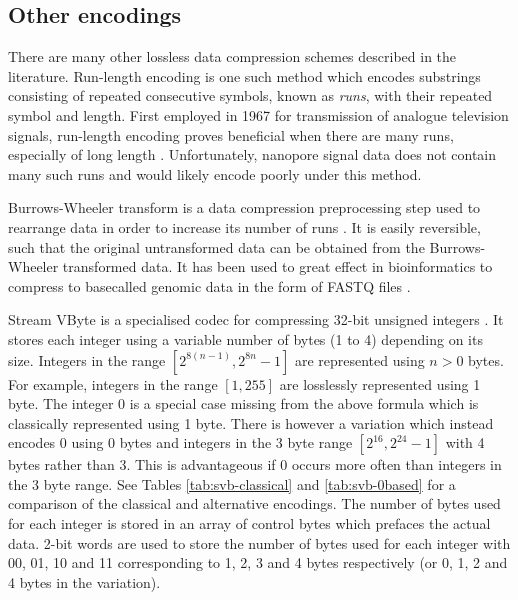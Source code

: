 \subsection{Other encodings}
\label{sec:data-other}

There are many other lossless data compression schemes described in the literature. Run-length encoding is one such method which encodes substrings consisting of repeated consecutive symbols, known as \textit{runs}, with their repeated symbol and length. First employed in 1967 for transmission of analogue television signals, run-length encoding proves beneficial when there are many runs, especially of long length \cite{rle}. Unfortunately, nanopore signal data does not contain many such runs and would likely encode poorly under this method.

Burrows-Wheeler transform is a data compression preprocessing step used to rearrange data in order to increase its number of runs \cite{bwt}. It is easily reversible, such that the original untransformed data can be obtained from the Burrows-Wheeler transformed data. It has been used to great effect in bioinformatics to compress to basecalled genomic data in the form of FASTQ files \cite{bwt-genomic}.

Stream VByte is a specialised codec for compressing 32-bit unsigned integers \cite{svb}. It stores each integer using a variable number of bytes (1 to 4) depending on its size. Integers in the range $[2^{8(n-1)},2^{8n}-1]$ are represented using $n>0$ bytes. For example, integers in the range $[1,255]$ are losslessly represented using 1 byte. The integer 0 is a special case missing from the above formula which is classically represented using 1 byte. There is however a variation which instead encodes 0 using 0 bytes and integers in the 3 byte range $[2^{16},2^{24}-1]$ with 4 bytes rather than 3. This is advantageous if 0 occurs more often than integers in the 3 byte range. See Tables \ref{tab:svb-classical} and \ref{tab:svb-0based} for a comparison of the classical and alternative encodings. The number of bytes used for each integer is stored in an array of control bytes which prefaces the actual data. 2-bit words are used to store the number of bytes used for each integer with 00, 01, 10 and 11 corresponding to 1, 2, 3 and 4 bytes respectively (or 0, 1, 2 and 4 bytes in the variation).

%



